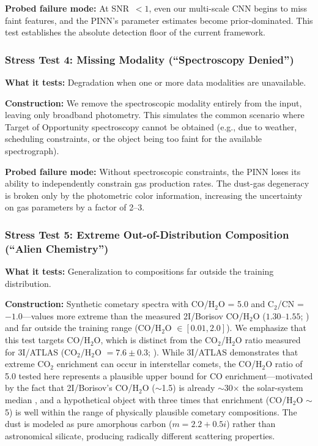 \documentclass[usenatbib]{mnras}
\begin{document}
\textbf{Probed failure mode:} At SNR~$<1$, even our multi-scale CNN begins to miss faint features, and the PINN's parameter estimates become prior-dominated. This test establishes the absolute detection floor of the current framework.

\subsubsection{Stress Test 4: Missing Modality (``Spectroscopy Denied'')}

\textbf{What it tests:} Degradation when one or more data modalities are unavailable.

\textbf{Construction:} We remove the spectroscopic modality entirely from the input, leaving only broadband photometry. This simulates the common scenario where Target of Opportunity spectroscopy cannot be obtained (e.g., due to weather, scheduling constraints, or the object being too faint for the available spectrograph).

\textbf{Probed failure mode:} Without spectroscopic constraints, the PINN loses its ability to independently constrain gas production rates. The dust-gas degeneracy is broken only by the photometric color information, increasing the uncertainty on gas parameters by a factor of 2--3.

\subsubsection{Stress Test 5: Extreme Out-of-Distribution Composition (``Alien Chemistry'')}

\textbf{What it tests:} Generalization to compositions far outside the training distribution.

\textbf{Construction:} Synthetic cometary spectra with CO/H$_2$O = 5.0 and C$_2$/CN = $-1.0$---values more extreme than the measured 2I/Borisov CO/H$_2$O ($1.30$--$1.55$; \citealt{bodewits20}) and far outside the training range (CO/H$_2$O $\in [0.01, 2.0]$). We emphasize that this test targets CO/H$_2$O, which is distinct from the CO$_2$/H$_2$O ratio measured for 3I/ATLAS (CO$_2$/H$_2$O $= 7.6 \pm 0.3$; \citealt{cordiner25}). While 3I/ATLAS demonstrates that extreme CO$_2$ enrichment can occur in interstellar comets, the CO/H$_2$O ratio of 5.0 tested here represents a plausible upper bound for CO enrichment---motivated by the fact that 2I/Borisov's CO/H$_2$O ($\sim$1.5) is already $\sim$30$\times$ the solar-system median \citep{bockelee04}, and a hypothetical object with three times that enrichment (CO/H$_2$O $\sim$ 5) is well within the range of physically plausible cometary compositions. The dust is modeled as pure amorphous carbon ($m = 2.2 + 0.5i$) rather than astronomical silicate, producing radically different scattering properties.
\end{document}
